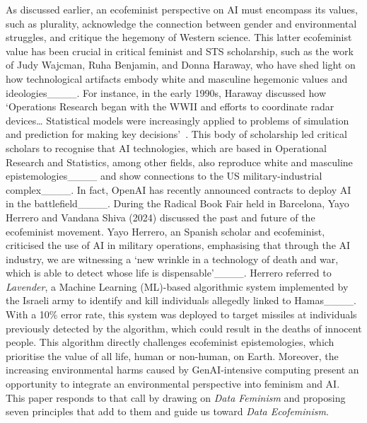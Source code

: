 As discussed earlier, an ecofeminist perspective on AI must encompass its values, such as plurality, acknowledge the connection between gender and environmental struggles, and critique the hegemony of Western science. This latter ecofeminist value has been crucial in critical feminist and STS scholarship, such as the work of Judy Wajcman, Ruha Benjamin, and Donna Haraway, who have shed light on how technological artifacts embody white and masculine hegemonic values and ideologies____. For instance, in the early 1990s, Haraway discussed how `Operations Research began with the WWII and efforts to coordinate radar devices… Statistical models were increasingly applied to problems of simulation and prediction for making key decisions'~\cite[p. 58]{haraway1991simians}. This body of scholarship led critical scholars to recognise that AI technologies, which are based in Operational Research and Statistics, among other fields, also reproduce white and masculine epistemologies____ and show connections to the US military-industrial complex____. In fact, OpenAI has recently announced contracts to deploy AI in the battlefield____. During the Radical Book Fair held in Barcelona, Yayo Herrero and Vandana Shiva (2024) discussed the past and future of the ecofeminist movement. Yayo Herrero, an Spanish scholar and ecofeminist, criticised the use of AI in military operations, emphasising that through the AI industry, we are witnessing a `new wrinkle in a technology of death and war, which is able to detect whose life is dispensable'____. Herrero referred to \textit{Lavender}, a Machine Learning (ML)-based algorithmic system implemented by the Israeli army to identify and kill individuals allegedly linked to Hamas____. With a 10\% error rate, this system was deployed to target missiles at individuals previously detected by the algorithm, which could result in the deaths of innocent people. This algorithm directly challenges ecofeminist epistemologies, which prioritise the value of all life, human or non-human, on Earth. Moreover, the increasing environmental harms caused by GenAI-intensive computing present an opportunity to integrate an environmental perspective into feminism and AI. This paper responds to that call by drawing on \textit{Data Feminism} and proposing seven principles that add to them and guide us toward \textit{Data Ecofeminism}.